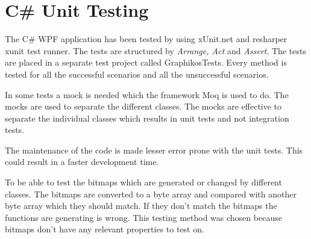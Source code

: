 \section{C\# Unit Testing}
The C\# WPF application has been tested by using xUnit.net and resharper xunit test runner. The tests are structured by \emph{Arrange, Act} and \emph{Assert}. The tests are placed in a separate test project called GraphikosTests. Every method is tested for all the successful scenarios and all the unsuccessful scenarios.

In some tests a mock is needed which the framework Moq is used to do. The mocks are used to separate the different classes. The mocks are effective to separate the individual classes which results in unit tests and not integration tests.

The maintenance of the code is made lesser error prone with the unit tests. This could result in a faster development time.

To be able to test the bitmaps which are generated or changed by different classes. The bitmaps are converted to a byte array and compared with another byte array which they should match. If they don’t match the bitmaps the functions are generating is wrong. This testing method was chosen because bitmaps don’t have any relevant properties to test on.